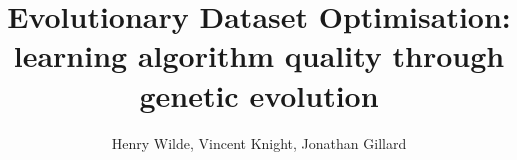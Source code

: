 \documentclass[10pt]{article}
\title{%
    Evolutionary Dataset Optimisation:
    learning algorithm quality through genetic evolution
}
\author{Henry Wilde, Vincent Knight, Jonathan Gillard}
\date{}
\begin{document}
\maketitle%
\bigskip%


\newpage%





\printbibliography
\end{document}
